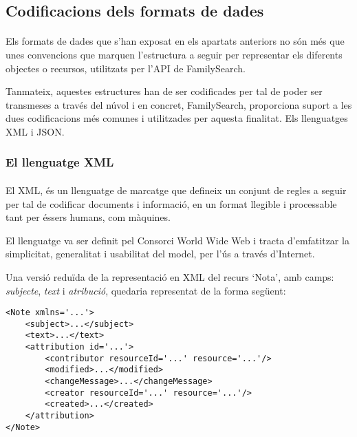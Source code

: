     \subsection{Codificacions dels formats de dades}

        \paragraph{}
        Els formats de dades que s’han exposat en els apartats anteriors no són més que unes convencions que marquen l'estructura a seguir per representar els diferents objectes o recursos, utilitzats per l'API de FamilySearch.

        Tanmateix, aquestes estructures han de ser codificades per tal de poder ser transmeses a través del núvol i en concret, FamilySearch, proporciona suport a les dues codificacions més comunes i utilitzades per aquesta finalitat. Els llenguatges XML i JSON.


        \subsubsection{El llenguatge XML}

        \paragraph{}
        El \gls{XML}, és un llenguatge de marcatge que defineix un conjunt de regles a seguir per tal de codificar documents i informació, en un format llegible i processable tant per éssers humans, com màquines.

        El llenguatge va ser definit pel Consorci World Wide Web i tracta d’emfatitzar la simplicitat, generalitat i usabilitat del model, per l'ús a través d'Internet.

        Una versió reduïda de la representació en XML del recurs `Nota', amb camps: \emph{subjecte}, \emph{text} i \emph{atribució}, quedaria representat de la forma següent:

        \begin{lstlisting}[style=rawOwn,caption={Representació bàsica en XML d'una Nota}]
<Note xmlns='...'>
    <subject>...</subject>
    <text>...</text>
    <attribution id='...'>
        <contributor resourceId='...' resource='...'/>
        <modified>...</modified>
        <changeMessage>...</changeMessage>
        <creator resourceId='...' resource='...'/>
        <created>...</created>
    </attribution>
</Note>
        \end{lstlisting}

